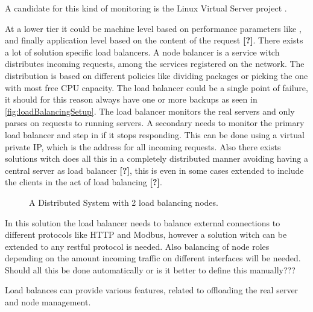 A candidate for this kind of monitoring is the Linux Virtual Server project \cite{zhang2000linuxVirtualServer}.



At a lower tier it could be machine level based on performance parameters like , and finally application level based on the content of the request \textbf{[?]}. %
There exists a lot of solution specific load balancers.
A node balancer is a service witch distributes incoming requests, among the services registered on the network.
The distribution is based on different policies like dividing packages or picking the one with most free CPU capacity.
The load balancer could be a single point of failure, it should for this reason always have one or more backups as seen in \cref{fig:loadBalancingSetup}.
The load balancer monitors the real servers and only parses on requests to running servers.
A secondary needs to monitor the primary load balancer and step in if it stops responding.
This can be done using a virtual private IP, which is the address for all incoming requests. Also there exists solutions witch does all this in a completely distributed manner avoiding having a central server as load balancer  \textbf{[?]}, %
this is even in some cases extended to include the clients in the act of load balancing \textbf{[?]}. %

\begin{figure}
	\centering	
	\scalebox{0.7}{}
	\caption[Distributed System with 2 load balancing nodes]{
		\label{fig:loadBalancingSetup2Balancers} 
		\footnotesize{%
			A Distributed System with 2 load balancing nodes.
		}
	}
\end{figure}

In this solution the load balancer needs to balance external connections to different protocols like HTTP and Modbus, however a solution witch can be extended to any restful protocol is needed.
Also balancing of node roles depending on the amount incoming traffic on different interfaces will be needed.
Should all this be done automatically or is it better to define this manually???

Load balances can provide various features, related to offloading the real server and node management. %

